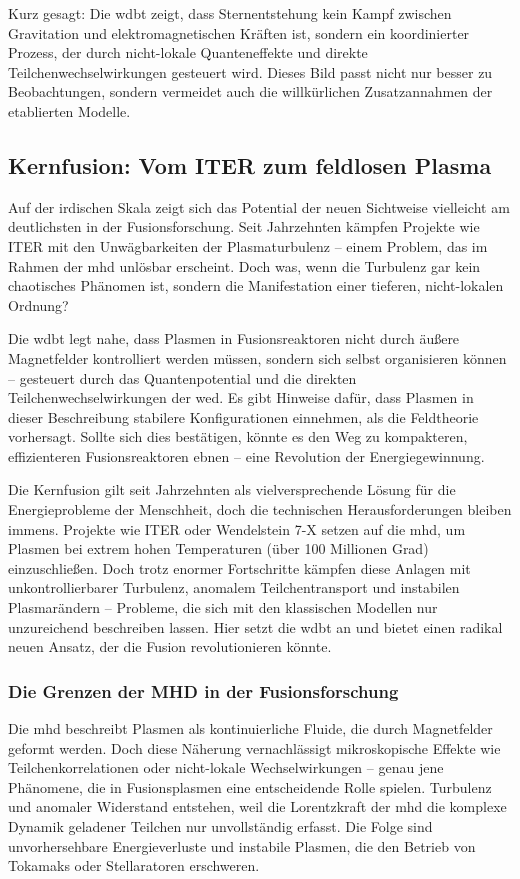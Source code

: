 Kurz gesagt: Die \gls{wdbt} zeigt, dass Sternentstehung kein Kampf zwischen Gravitation und elektromagnetischen Kräften ist, sondern ein koordinierter Prozess, der durch
nicht-lokale Quanteneffekte und direkte Teilchenwechselwirkungen gesteuert wird. Dieses Bild passt nicht nur besser zu Beobachtungen, sondern vermeidet auch die willkürlichen
Zusatzannahmen der etablierten Modelle.

\subsection{Kernfusion: Vom ITER zum feldlosen Plasma}
Auf der irdischen Skala zeigt sich das Potential der neuen Sichtweise vielleicht am deutlichsten in der Fusionsforschung. Seit Jahrzehnten kämpfen Projekte wie ITER mit den
Unwägbarkeiten der Plasmaturbulenz – einem Problem, das im Rahmen der \gls{mhd} unlösbar erscheint. Doch was, wenn die Turbulenz gar kein chaotisches Phänomen ist,
sondern die Manifestation einer tieferen, nicht-lokalen Ordnung?

Die \gls{wdbt} legt nahe, dass Plasmen in Fusionsreaktoren nicht durch äußere Magnetfelder kontrolliert werden müssen, sondern sich selbst organisieren können – gesteuert durch
das Quantenpotential und die direkten Teilchenwechselwirkungen der \gls{wed}. Es gibt Hinweise dafür, dass Plasmen in dieser Beschreibung stabilere Konfigurationen
einnehmen, als die Feldtheorie vorhersagt. Sollte sich dies bestätigen, könnte es den Weg zu kompakteren, effizienteren Fusionsreaktoren ebnen – eine Revolution der Energiegewinnung.

Die Kernfusion gilt seit Jahrzehnten als vielversprechende Lösung für die Energieprobleme der Menschheit, doch die technischen Herausforderungen bleiben immens. Projekte wie ITER oder
Wendelstein 7-X setzen auf die \gls{mhd}, um Plasmen bei extrem hohen Temperaturen (über 100 Millionen Grad) einzuschließen. Doch trotz enormer Fortschritte kämpfen diese Anlagen mit
unkontrollierbarer Turbulenz, anomalem Teilchentransport und instabilen Plasmarändern – Probleme, die sich mit den klassischen Modellen nur unzureichend beschreiben lassen. Hier setzt
die \gls{wdbt} an und bietet einen radikal neuen Ansatz, der die Fusion revolutionieren könnte.

\subsubsection{Die Grenzen der MHD in der Fusionsforschung}
Die \gls{mhd} beschreibt Plasmen als kontinuierliche Fluide, die durch Magnetfelder geformt werden. Doch diese Näherung vernachlässigt mikroskopische Effekte wie Teilchenkorrelationen
oder nicht-lokale Wechselwirkungen – genau jene Phänomene, die in Fusionsplasmen eine entscheidende Rolle spielen. Turbulenz und anomaler Widerstand entstehen, weil die Lorentzkraft der
\gls{mhd} die komplexe Dynamik geladener Teilchen nur unvollständig erfasst. Die Folge sind unvorhersehbare Energieverluste und instabile Plasmen, die den Betrieb von Tokamaks oder
Stellaratoren erschweren.

